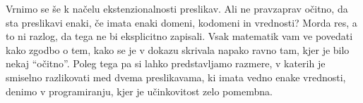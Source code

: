 Vrnimo se še k načelu ekstenzionalnosti preslikav. Ali ne pravzaprav očitno, da sta
preslikavi enaki, če imata enaki domeni, kodomeni in vrednosti? Morda res, a to ni razlog,
da tega ne bi eksplicitno zapisali. Vsak matematik vam ve povedati kako zgodbo o tem,
kako se je v dokazu skrivala napako ravno tam, kjer je bilo nekaj ``očitno''. Poleg tega
pa si lahko predstavljamo razmere, v katerih je smiselno razlikovati med dvema
preslikavama, ki imata vedno enake vrednosti, denimo v programiranju, kjer je učinkovitost
zelo pomembna.






